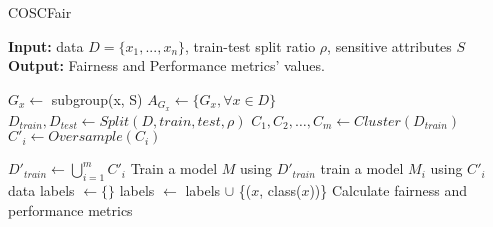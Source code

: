 \begin{algorithm}
\begin{small}
    \caption{COSCFair}
    \begin{flushleft}
    \textbf{Input:} data $D = \{x_1,...,x_n\}$, train-test split ratio $\rho$, sensitive attributes $S$\\
    \noindent\textbf{Output:} Fairness and Performance metrics' values.
    \end{flushleft}
	\begin{algorithmic}[1]
	    \State $G_x \leftarrow$ subgroup(x, S) \hspace{1ex}
		\EndFor
		\State $A_{G_x}\leftarrow \{G_x, \forall x \in D\}$ \hspace{2ex}
		\State $D_{train}, D_{test} \leftarrow Split(D, train, test, \rho)$
	    \State $C_1, C_2, \dots, C_m \leftarrow Cluster(D_{train})$  \hspace{2ex}
	    \State $C'_i \leftarrow Oversample(C_i)$ \hspace{2ex} 
		\EndFor
		
		\State $D'_{train}\leftarrow \bigcup_{i=1}^m C'_i$
		\State Train a model $M$ using $D'_{train}$
		\EndIf
		        \State train a model $M_i$ using $C'_i$ data
		    \EndFor
		\EndIf
		labels $\leftarrow \{\}$
		\State labels $\leftarrow$ labels $\cup$ \{($x$, class($x$))\}
		\EndFor
		\State Calculate fairness and performance metrics %
		\EndFor
		
	\end{algorithmic} 
\end{small}
\end{algorithm} 
